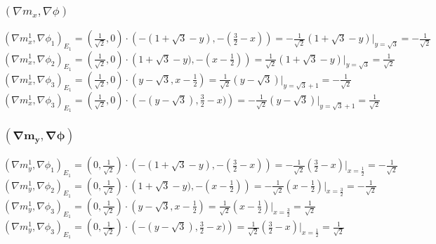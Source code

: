 \documentclass{article}
\begin{document}


\subsubsection{$(\nabla m_x,\nabla\phi)$}
$(\nabla m_x^1,\nabla\phi_1)_{E_1} = 
\left(\frac{1}{\sqrt{2}},0\right)\cdot\left(-(1 + \sqrt{3} - y),  -(\frac{3}{2}-x)\right) = 
-\frac{1}{\sqrt{2}}(1 + \sqrt{3} - y)|_{y=\sqrt{3}} = 
-\frac{1}{\sqrt{2}}$\\
$(\nabla m_x^1,\nabla\phi_2)_{E_1} = 
\left(\frac{1}{\sqrt{2}},0\right)\cdot\left(1 + \sqrt{3} - y),  -(x-\frac{1}{2})\right) = 
\frac{1}{\sqrt{2}}(1 + \sqrt{3} - y)|_{y=\sqrt{3}} = 
\frac{1}{\sqrt{2}}$\\
$(\nabla m_x^1,\nabla\phi_3)_{E_1} = 
\left(\frac{1}{\sqrt{2}},0\right)\cdot\left(y-\sqrt{3}, x-\frac{1}{2}\right) = 
\frac{1}{\sqrt{2}}(y-\sqrt{3})|_{y=\sqrt{3}+1} = 
-\frac{1}{\sqrt{2}}$\\
$(\nabla m_x^1,\nabla\phi_3)_{E_1} = 
\left(\frac{1}{\sqrt{2}},0\right)\cdot\left(-(y-\sqrt{3}), \frac{3}{2}-x)\right) = 
-\frac{1}{\sqrt{2}}(y-\sqrt{3})|_{y=\sqrt{3}+1} = 
\frac{1}{\sqrt{2}}$\\


\subsubsection{$\mathbf{(\nabla m_y,\nabla\phi)}$}
$(\nabla m_y^1,\nabla\phi_1)_{E_1} = 
\left(0,\frac{1}{\sqrt{2}}\right)\cdot\left(-(1 + \sqrt{3} - y),  -(\frac{3}{2}-x)\right) = 
-\frac{1}{\sqrt{2}}(\frac{3}{2}-x)|_{x=\frac{1}{2}} = 
-\frac{1}{\sqrt{2}}$\\
$(\nabla m_y^1,\nabla\phi_2)_{E_1} = 
\left(0,\frac{1}{\sqrt{2}}\right)\cdot\left(1 + \sqrt{3} - y),  -(x-\frac{1}{2})\right) = 
-\frac{1}{\sqrt{2}}(x - \frac{1}{2})|_{x=\frac{3}{2}} = 
-\frac{1}{\sqrt{2}}$\\
$(\nabla m_y^1,\nabla\phi_3)_{E_1} = 
\left(0,\frac{1}{\sqrt{2}}\right)\cdot\left(y-\sqrt{3}, x-\frac{1}{2}\right) = 
\frac{1}{\sqrt{2}}(x-\frac{1}{2})|_{x=\frac{3}{2}} = 
\frac{1}{\sqrt{2}}$\\
$(\nabla m_y^1,\nabla\phi_3)_{E_1} = 
\left(0,\frac{1}{\sqrt{2}}\right)\cdot\left(-(y-\sqrt{3}), \frac{3}{2}-x)\right) = 
\frac{1}{\sqrt{2}}(\frac{3}{2}-x)|_{x=\frac{1}{2}} = 
\frac{1}{\sqrt{2}}$\\
\end{document}
